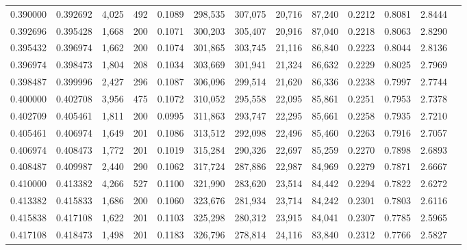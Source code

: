 \begin{tabular}{rrrrrrrrrrrrr}
0.390000 & 0.392692 & 4,025 & 492 &                                     0.1089 & 298,535 & 307,075 &  20,716 &  87,240 & 0.2212 & 0.8081 & 2.8444 \\
0.392696 & 0.395428 & 1,668 & 200 &                                     0.1071 & 300,203 & 305,407 &  20,916 &  87,040 & 0.2218 & 0.8063 & 2.8290 \\
0.395432 & 0.396974 & 1,662 & 200 &                                     0.1074 & 301,865 & 303,745 &  21,116 &  86,840 & 0.2223 & 0.8044 & 2.8136 \\
0.396974 & 0.398473 & 1,804 & 208 &                                     0.1034 & 303,669 & 301,941 &  21,324 &  86,632 & 0.2229 & 0.8025 & 2.7969 \\
0.398487 & 0.399996 & 2,427 & 296 &                                     0.1087 & 306,096 & 299,514 &  21,620 &  86,336 & 0.2238 & 0.7997 & 2.7744 \\
0.400000 & 0.402708 & 3,956 & 475 &                                     0.1072 & 310,052 & 295,558 &  22,095 &  85,861 & 0.2251 & 0.7953 & 2.7378 \\
0.402709 & 0.405461 & 1,811 & 200 &                                     0.0995 & 311,863 & 293,747 &  22,295 &  85,661 & 0.2258 & 0.7935 & 2.7210 \\
0.405461 & 0.406974 & 1,649 & 201 &                                     0.1086 & 313,512 & 292,098 &  22,496 &  85,460 & 0.2263 & 0.7916 & 2.7057 \\
0.406974 & 0.408473 & 1,772 & 201 &                                     0.1019 & 315,284 & 290,326 &  22,697 &  85,259 & 0.2270 & 0.7898 & 2.6893 \\
0.408487 & 0.409987 & 2,440 & 290 &                                     0.1062 & 317,724 & 287,886 &  22,987 &  84,969 & 0.2279 & 0.7871 & 2.6667 \\
0.410000 & 0.413382 & 4,266 & 527 &                                     0.1100 & 321,990 & 283,620 &  23,514 &  84,442 & 0.2294 & 0.7822 & 2.6272 \\
0.413382 & 0.415833 & 1,686 & 200 &                                     0.1060 & 323,676 & 281,934 &  23,714 &  84,242 & 0.2301 & 0.7803 & 2.6116 \\
0.415838 & 0.417108 & 1,622 & 201 &                                     0.1103 & 325,298 & 280,312 &  23,915 &  84,041 & 0.2307 & 0.7785 & 2.5965 \\
0.417108 & 0.418473 & 1,498 & 201 &                                     0.1183 & 326,796 & 278,814 &  24,116 &  83,840 & 0.2312 & 0.7766 & 2.5827 \\

\end{tabular}
